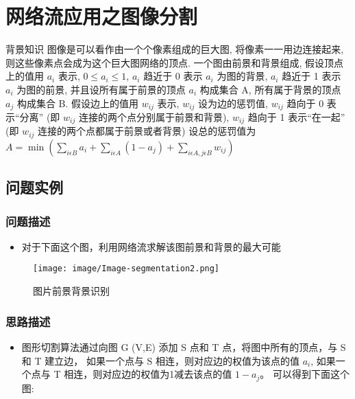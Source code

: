 \chapter{网络流应用之图像分割}




\begin{definition}{背景知识}{}
	图像是可以看作由一个个像素组成的巨大图, 将像素一一用边连接起来, 则这些像素点会成为这个巨大图网络的顶点.
	一个图由前景和背景组成, 假设顶点上的值用 $a_i$ 表示, $ 0 \leq a_i \leq 1 $,  $a_i$ 趋近于 0 表示 $a_i$ 为图的背景, $a_i$ 趋近于 1 表示 $a_i$ 为图的前景, 并且设所有属于前景的顶点 $a_i$ 构成集合 A, 所有属于背景的顶点 $a_j$ 构成集合 B.
	假设边上的值用 $w_{ij}$ 表示, $w_{ij}$ 设为边的惩罚值, $w_{ij}$ 趋向于 0 表示“分离” (即 $w_{ij}$ 连接的两个点分别属于前景和背景), $w_{ij}$ 趋向于 1 表示“在一起” (即 $w_{ij}$ 连接的两个点都属于前景或者背景)
	设总的惩罚值为 $ A = \min\left(\sum_{i \epsilon B}a_i +  \sum_{i \epsilon A}(1 - a_j) + \sum_{i \epsilon A, j \epsilon B}w_{ij} \right) $
\end{definition}


\section{问题实例}
\subsection{问题描述}
\begin{itemize}
	\item 对于下面这个图，利用网络流求解该图前景和背景的最大可能
\end{itemize}

\begin{figure}[htb]
	\centering
	\texttt{[image: image/Image-segmentation2.png]}
	\caption{图片前景背景识别}\label{fig:image-seg-1}
\end{figure}

\subsection{思路描述}
\begin{itemize}
	\item 图形切割算法通过向图 G (V,E) 添加 S 点和 T 点，将图中所有的顶点，与 S 和 T 建立边，
	      如果一个点与 S 相连，则对应边的权值为该点的值 $a_i$, 如果一个点与 T 相连，则对应边的权值为1减去该点的值 $ 1 - a_j $。
	      可以得到下面这个图:
\end{itemize}

